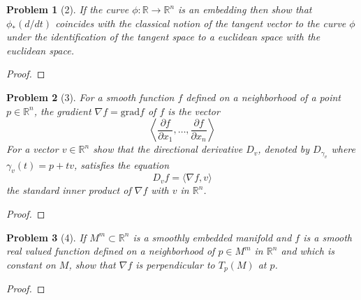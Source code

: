\documentclass[10pt]{article}
\newcommand{\sk}{\vskip 10mm}
\newcommand{\bb}[1]{\mathbb{#1}}
\theoremstyle{plain}
\newtheorem{problem}{Problem}
\theoremstyle{remark}
\begin{document}
\begin{problem}[2]
  If the curve $\phi:\bb{R}\rightarrow\bb{R}^n$ is an embedding then show that
  $\phi_*(d/dt)$ coincides with the classical notion of the tangent
  vector to the curve $\phi$ under the identification of the tangent
  space to a euclidean space with the euclidean space.
\end{problem}

\begin{proof}
  
\end{proof}

\sk

\begin{problem}[3]
  For a smooth function $f$ defined on a neighborhood of a point
  $p\in \bb{R}^n$, the gradient $\nabla f=\mathrm{grad}f$ of $f$ is the vector
  \[
    \left\langle
      \frac{\partial f}{\partial x_1},\ldots,\frac{\partial f}{\partial x_n}
    \right\rangle
  \]
  For a vector $v\in\bb{R}^n$ show that the directional derivative $D_v$,
  denoted by $D_{\gamma_v}$ where $\gamma_v(t)=p+tv$, satisfies the equation
  \[
    D_vf =\langle \nabla f,v\rangle
  \]
  the standard inner product of $\nabla f$ with $v$ in $\bb{R}^n$.
\end{problem}

\begin{proof}
  
\end{proof}

\sk

\begin{problem}[4]
  If $M^m\subset\bb{R}^n$ is a smoothly embedded manifold and $f$
  is a smooth real valued function defined on a neighborhood of
  $p\in M^m$ in $\bb{R}^n$ and which is constant on $M$, show that $\nabla f$
  is perpendicular to $T_p(M)$ at $p$.
\end{problem}

\begin{proof}
  
\end{proof}

\sk

\end{document}
